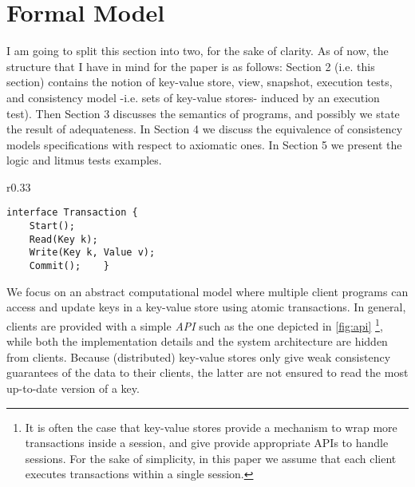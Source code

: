 \section{Formal Model}
\label{sec:model}
\label{sec:semantics}
\ac{I am going to split this section into two, for the sake of clarity. 
As of now, the structure that I have in mind for the paper is as follows: 
Section 2 (i.e. this section) contains the notion of key-value store, view, snapshot, 
execution tests, and consistency model  -i.e. sets of key-value stores- 
induced by an execution test). Then Section 3 discusses 
the semantics of programs, and possibly we state the result 
of adequateness. In Section 4 we discuss the equivalence of consistency 
models specifications with respect to axiomatic ones. In Section 5 
we present the logic and litmus tests examples.}

\begin{wrapfigure}[7]{r}{0.33\textwidth}
\vspace{-10pt}
\begin{verbatim}
interface Transaction {
    Start(); 
    Read(Key k);
    Write(Key k, Value v); 
    Commit();    }
\end{verbatim}
\vspace{-10pt}
\caption{Example of Transaction API.}
\label{fig:api}
\end{wrapfigure}
We focus on an abstract computational model where multiple client programs can access and update keys in a key-value store using atomic transactions. 
In general, clients are provided with a simple \textit{API} such as the one depicted in \cref{fig:api} \cite{gdur,physicsnmsi,clockSI}\footnote{It is 
often the case that key-value stores provide a mechanism to wrap more transactions inside a session, and give 
provide appropriate APIs to handle sessions. For the sake of simplicity, in this paper we assume that each client executes transactions 
within a single session.}, while both the implementation details and the system architecture are hidden from clients. 
Because (distributed) key-value stores only give weak consistency guarantees of the data to their clients, the latter are 
not ensured to read the most up-to-date version of a key.

